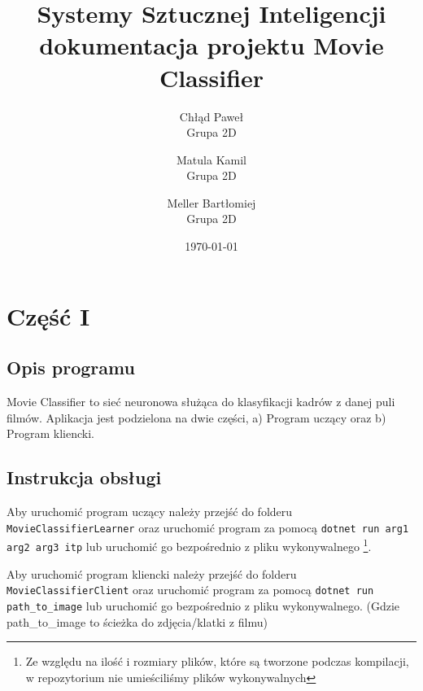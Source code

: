 \documentclass[12pt,a4paper]{article}
\begin{document}
	
	\title{Systemy Sztucznej Inteligencji\\\small{dokumentacja projektu Movie Classifier}}
	\author{
	Chłąd Paweł\\
	Grupa 2D
	\and
	Matula Kamil\\
	Grupa 2D
	\and
	Meller Bartłomiej\\
	Grupa 2D}
	\date{\today}

	\maketitle
	\newpage
	\section*{Część I}
	\subsection*{Opis programu}
	\hspace{20pt} Movie Classifier to sieć neuronowa służąca do klasyfikacji kadrów z danej puli filmów. Aplikacja jest podzielona na dwie części, a) Program uczący oraz b) Program kliencki.
	\subsection*{Instrukcja obsługi}
	
	\hspace{20pt} Aby uruchomić program uczący należy przejść do folderu \lstinline{MovieClassifierLearner} oraz uruchomić program za pomocą \lstinline{dotnet run arg1 arg2 arg3 itp} lub uruchomić go bezpośrednio z pliku wykonywalnego \footnote{Ze względu na ilość i rozmiary plików, które są tworzone podczas kompilacji, w repozytorium nie umieściliśmy plików wykonywalnych}. 

	Aby uruchomić program kliencki należy przejść do folderu  \lstinline{MovieClassifierClient} oraz uruchomić program za pomocą \lstinline{dotnet run path_to_image} lub uruchomić go bezpośrednio z pliku wykonywalnego. (Gdzie path\_to\_image to ścieżka do zdjęcia/klatki z filmu)
	
	
\end{document}
